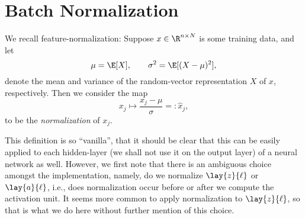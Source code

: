 

\section{Batch Normalization}

We recall feature-normalization:  Suppose $x\in\R^{n\times N}$ is some training data, and let
$$\mu=\E[X],\qquad\sigma^2=\E[(X-\mu)^2],$$
denote the mean and variance of the random-vector representation $X$ of $x$, respectively.  Then we consider the map
$$x_j\mapsto\frac{x_j-\mu}{\sigma}=:\hat{x}_j,$$
to be the \textit{normalization} of $x_j$.

This definition is so ``vanilla'', that it should be clear that this can be easily applied to each hidden-layer (we shall not use it on the output layer) of a neural network as well.  However, we first note that there is an ambiguous choice amongst the implementation, namely, do we normalize $\lay{z}{\ell}$ or $\lay{a}{\ell}$, i.e., does normalization occur before or after we compute the activation unit.  It seems more common to apply normalization to $\lay{z}{\ell}$, so that is what we do here without further mention of this choice.

